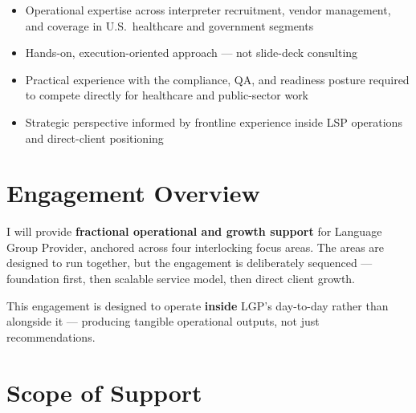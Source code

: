 \documentclass{proposal}
\begin{document}
\begin{itemize}[leftmargin=1.5em, itemsep=4pt, topsep=4pt]
  \item Operational expertise across interpreter recruitment, vendor
        management, and coverage in U.S.\ healthcare and government segments
  \item Hands-on, execution-oriented approach --- not slide-deck consulting
  \item Practical experience with the compliance, QA, and readiness posture
        required to compete directly for healthcare and public-sector work
  \item Strategic perspective informed by frontline experience inside LSP
        operations and direct-client positioning
\end{itemize}

\section{Engagement Overview}

I will provide \textbf{fractional operational and growth support} for
Language Group Provider, anchored across four interlocking focus areas. The
areas are designed to run together, but the engagement is deliberately
sequenced --- foundation first, then scalable service model, then direct
client growth.

\vspace{4pt}
\vspace{4pt}

This engagement is designed to operate \textbf{inside} LGP's day-to-day
rather than alongside it --- producing tangible operational outputs, not just
recommendations.

\section{Scope of Support}
\end{document}
